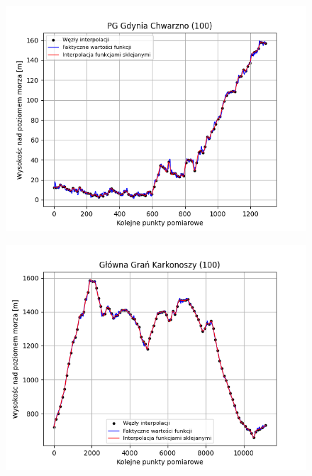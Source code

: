 \documentclass[fleqn]{article}
\begin{document}
    \begin{figure}[h]
        \centering
        \begin{minipage}{.33\textwidth}
            \centering
            \includegraphics[width=\linewidth]{plot_100_points_PG_Gdynia_Chwarzno.png}
            \label{fig:sub1}
        \end{minipage}%
        \begin{minipage}{.33\textwidth}
          \centering
          \includegraphics[width=\linewidth]{plot_100_points_Główna_Grań_Karkonoszy.png}
          \label{fig:sub2}
        \end{minipage}%
        \begin{minipage}{.33\textwidth}
          \centering

\end{minipage}
\end{figure}
\end{document}
